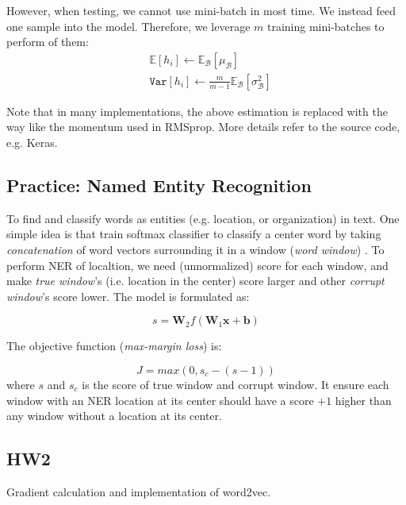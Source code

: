 However, when testing, we cannot use mini-batch in most time.
We instead feed one sample into the model.
Therefore, we leverage $m$ training mini-batches to perform  of them:
\begin{align}
&\mathbb{E}[h_i] \leftarrow \mathbb{E}_{\mathcal{B}}[\mu_{\mathcal{B}}] \nonumber \\
&\texttt{Var}[h_i] \leftarrow \frac{m}{m-1} \mathbb{E}_{\mathcal{B}}[\sigma_{\mathcal{B}}^2] \nonumber
\end{align}

Note that in many implementations, the above estimation is replaced with the way like the momentum used in RMSprop.
More details refer to the source code, e.g. Keras.

\subsection{Practice: Named Entity Recognition}
To find and classify words as entities (e.g. location, or organization) in text.
One simple idea is that train softmax classifier to classify a center word by taking
\emph{concatenation} of word vectors surrounding it in a window (\emph{word window}) .
To perform NER of localtion, we need (unnormalized) score for each window, and make \emph{true window}’s (i.e. location in the center) score larger and other \emph{corrupt window}’s score lower.
The model is formulated as:

\begin{equation}
s = \bm{W}_2 f(\bm{W}_1 \bm{x} + \bm{b})
\end{equation}


The objective function (\emph{max-margin loss}) is:

\begin{equation}
J = max(0, s_c - (s - 1))
\end{equation}
where $s$ and $s_c$ is the score of true window and corrupt window.
It ensure each window with an NER location at its center should have a score $+1$ higher than any window without a location at its center.

\subsection{HW2}

Gradient calculation and implementation of word2vec.

